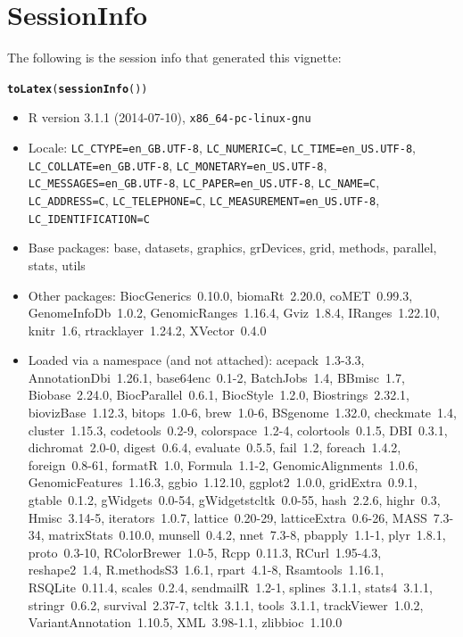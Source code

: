 \documentclass[11pt]{article}\usepackage[]{graphicx}\usepackage[usenames,dvipsnames]{color}
\makeatletter
\newcommand{\hlstd}[1]{\textcolor[rgb]{0.345,0.345,0.345}{#1}}%
\newcommand{\hlkwd}[1]{\textcolor[rgb]{0.737,0.353,0.396}{\textbf{#1}}}%
\newenvironment{kframe}{%
 \def\at@end@of@kframe{}%
 \ifinner\ifhmode%
  \def\at@end@of@kframe{\end{minipage}}%
  \begin{minipage}{\columnwidth}%
 \fi\fi%
 \def\FrameCommand##1{\hskip\@totalleftmargin \hskip-\fboxsep
 \colorbox{shadecolor}{##1}\hskip-\fboxsep
     \hskip-\linewidth \hskip-\@totalleftmargin \hskip\columnwidth}%
 \MakeFramed {\advance\hsize-\width
   \@totalleftmargin\z@ \linewidth\hsize
   \@setminipage}}%
 {\par\unskip\endMakeFramed%
 \at@end@of@kframe}
\makeatother
\begin{document}
\section*{SessionInfo}
The following is the session info that generated this vignette:
\begin{kframe}
\begin{alltt}
\hlkwd{toLatex}\hlstd{(}\hlkwd{sessionInfo}\hlstd{())}
\end{alltt}
\end{kframe}\begin{itemize}\raggedright
  \item R version 3.1.1 (2014-07-10), \verb|x86_64-pc-linux-gnu|
  \item Locale: \verb|LC_CTYPE=en_GB.UTF-8|, \verb|LC_NUMERIC=C|, \verb|LC_TIME=en_US.UTF-8|, \verb|LC_COLLATE=en_GB.UTF-8|, \verb|LC_MONETARY=en_US.UTF-8|, \verb|LC_MESSAGES=en_GB.UTF-8|, \verb|LC_PAPER=en_US.UTF-8|, \verb|LC_NAME=C|, \verb|LC_ADDRESS=C|, \verb|LC_TELEPHONE=C|, \verb|LC_MEASUREMENT=en_US.UTF-8|, \verb|LC_IDENTIFICATION=C|
  \item Base packages: base, datasets, graphics, grDevices, grid, methods,
    parallel, stats, utils
  \item Other packages: BiocGenerics~0.10.0, biomaRt~2.20.0, coMET~0.99.3,
    GenomeInfoDb~1.0.2, GenomicRanges~1.16.4, Gviz~1.8.4, IRanges~1.22.10,
    knitr~1.6, rtracklayer~1.24.2, XVector~0.4.0
  \item Loaded via a namespace (and not attached): acepack~1.3-3.3,
    AnnotationDbi~1.26.1, base64enc~0.1-2, BatchJobs~1.4, BBmisc~1.7,
    Biobase~2.24.0, BiocParallel~0.6.1, BiocStyle~1.2.0, Biostrings~2.32.1,
    biovizBase~1.12.3, bitops~1.0-6, brew~1.0-6, BSgenome~1.32.0, checkmate~1.4,
    cluster~1.15.3, codetools~0.2-9, colorspace~1.2-4, colortools~0.1.5,
    DBI~0.3.1, dichromat~2.0-0, digest~0.6.4, evaluate~0.5.5, fail~1.2,
    foreach~1.4.2, foreign~0.8-61, formatR~1.0, Formula~1.1-2,
    GenomicAlignments~1.0.6, GenomicFeatures~1.16.3, ggbio~1.12.10,
    ggplot2~1.0.0, gridExtra~0.9.1, gtable~0.1.2, gWidgets~0.0-54,
    gWidgetstcltk~0.0-55, hash~2.2.6, highr~0.3, Hmisc~3.14-5, iterators~1.0.7,
    lattice~0.20-29, latticeExtra~0.6-26, MASS~7.3-34, matrixStats~0.10.0,
    munsell~0.4.2, nnet~7.3-8, pbapply~1.1-1, plyr~1.8.1, proto~0.3-10,
    RColorBrewer~1.0-5, Rcpp~0.11.3, RCurl~1.95-4.3, reshape2~1.4,
    R.methodsS3~1.6.1, rpart~4.1-8, Rsamtools~1.16.1, RSQLite~0.11.4,
    scales~0.2.4, sendmailR~1.2-1, splines~3.1.1, stats4~3.1.1, stringr~0.6.2,
    survival~2.37-7, tcltk~3.1.1, tools~3.1.1, trackViewer~1.0.2,
    VariantAnnotation~1.10.5, XML~3.98-1.1, zlibbioc~1.10.0
\end{itemize}
\end{document}
